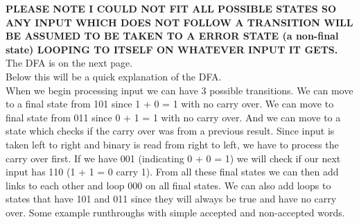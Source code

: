 \documentclass{article}
\begin{document}
\textbf{PLEASE NOTE I COULD NOT FIT ALL POSSIBLE STATES SO ANY INPUT WHICH DOES NOT FOLLOW A TRANSITION WILL BE ASSUMED TO BE TAKEN TO A ERROR STATE (a non-final state) LOOPING TO ITSELF ON WHATEVER INPUT IT GETS.}\\
The DFA is on the next page.\\
Below this will be a quick explanation of the DFA.\\
When we begin processing input we can have 3 possible transitions. We can move to a final state from 101 since 1 + 0 = 1 with no carry over. We can move to final state from 011 since 0 + 1 = 1 with no carry over. And we can move to a state which checks if the carry over was from a previous result. Since input is taken left to right and binary is read from right to left, we have to process the carry over first. If we have 001 (indicating 0 + 0 = 1) we will check if our next input has 110 (1 + 1 = 0 carry 1). From all these final states we can then add links to each other and loop 000 on all final states. We can also add loops to states that have 101 and 011 since they will always be true and have no carry over.
Some example runthroughs with simple accepted and non-accepted words.
\end{document}
